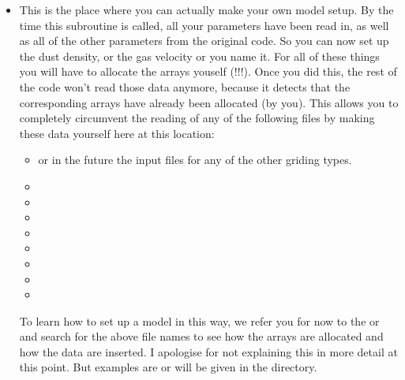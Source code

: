 \documentclass[letterpaper,10pt,english]{sphinxmanual}
\begin{document}
\begin{itemize}
\item {} 

This is the place where you can actually make your own model setup.  By the
time this subroutine is called, all your parameters have been read in, as well
as all of the other parameters from the original  code. So you can
now set up the dust density, or the gas velocity or you name it. For all of
these things you will have to allocate the arrays youself (!!!). Once you did
this, the rest of the  code won’t read those data anymore, because
it detects that the corresponding arrays have already been allocated (by
you). This allows you to completely circumvent the reading of any of the
following files by making these data yourself here at this location:
\begin{itemize}
\item {} 
 or in the future the input files for any of the other griding types.

\item {} 

\item {} 

\item {} 

\item {} 

\item {} 

\item {} 

\item {} 

\item {} 

\end{itemize}

To learn how to set up a model in this way, we refer you for now to the
 or  and search for the above file
names to see how the arrays are allocated and how the data are inserted. I
apologise for not explaining this in more detail at this point. But examples
are or will be given in the  directory.


\end{itemize}
\end{document}
